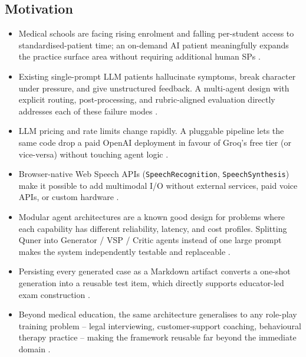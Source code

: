 \documentclass{article}
\begin{document}
\subsection{Motivation}
\begin{itemize}
    \item Medical schools are facing rising enrolment and falling per-student access to standardised-patient time; an on-demand AI patient meaningfully expands the practice surface area without requiring additional human SPs \cite{Portovaras2024CurrentTA,Azzara2023PeranPP}.

    \item Existing single-prompt LLM patients hallucinate symptoms, break character under pressure, and give unstructured feedback. A multi-agent design with explicit routing, post-processing, and rubric-aligned evaluation directly addresses each of these failure modes \cite{Zhang2023SentimentAI,Plale2013BigDO}.

    \item LLM pricing and rate limits change rapidly. A pluggable pipeline lets the same code drop a paid OpenAI deployment in favour of Groq's free tier (or vice-versa) without touching agent logic \cite{Kulkarni2023TheEO,Topsakal2023CreatingLL}.

    \item Browser-native Web Speech APIs (\texttt{SpeechRecognition}, \texttt{SpeechSynthesis}) make it possible to add multimodal I/O without external services, paid voice APIs, or custom hardware \cite{Mahajan2022TextualDQ}.

    \item Modular agent architectures are a known good design for problems where each capability has different reliability, latency, and cost profiles. Splitting Quner into Generator / VSP / Critic agents instead of one large prompt makes the system independently testable and replaceable \cite{Cheptsov2013IntroducingAN,Rygl2017SemanticVE}.

    \item Persisting every generated case as a Markdown artifact converts a one-shot generation into a reusable test item, which directly supports educator-led exam construction \cite{Ren2024AdvancementsAA}.

    \item Beyond medical education, the same architecture generalises to any role-play training problem -- legal interviewing, customer-support coaching, behavioural therapy practice -- making the framework reusable far beyond the immediate domain \cite{Jing2024WhenLL,Monir2024VectorSearchED}.
\end{itemize}
\end{document}

